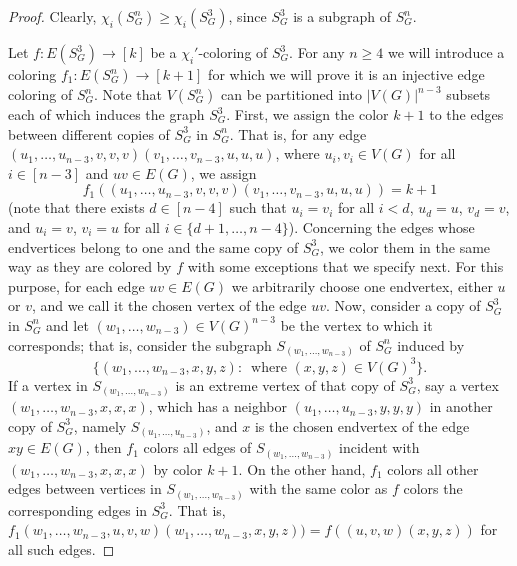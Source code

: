 \documentclass{article}
\begin{document}
\begin{proof}
Clearly, $\chi_i(S_G^n)\geq \chi_i(S_G^3)$, since $S_G^3$ is a subgraph of $S_G^n$.

Let $f:E(S_G^3)\rightarrow [k]$ be a $\chi_i'$-coloring of $S_G^3$. For any $n\ge 4$ we will introduce a coloring $f_1:E(S_G^n)\rightarrow [k+1]$ for which we will prove it is an injective edge coloring of $S_G^n$. Note that $V(S_G^n)$ can be partitioned into $|V(G)|^{n-3}$ subsets each of which induces the graph $S_G^3$.  First, we assign the color $k+1$ to the edges between different copies of $S_G^3$ in $S_G^n$. That is, for any edge $(u_1,\ldots,u_{n-3},v,v,v)(v_1,\ldots,v_{n-3},u,u,u)$, where $u_i,v_i\in V(G)$ for all $i\in [n-3]$ and $uv\in E(G)$, we assign $$f_1((u_1,\ldots,u_{n-3},v,v,v)(v_1,\ldots,v_{n-3},u,u,u))=k+1$$ 
(note that there exists $d\in [n-4]$ such that $u_i=v_i$ for all $i<d$, $u_d=u$, $v_d=v$, and $u_i=v$, $v_i=u$ for all $i\in\{d+1,\ldots,n-4\}$).
Concerning the edges whose endvertices belong to one and the same copy of $S_G^3$, we color them in the same way as they are colored by $f$ with some exceptions that we specify next. For this purpose, for each edge $uv\in E(G)$ we arbitrarily choose one endvertex, either $u$ or $v$, and we call it the chosen vertex of the edge $uv$. Now, consider a copy of $S_G^3$ in $S_G^n$ and let $(w_1,\ldots,w_{n-3})\in V(G)^{n-3}$ be the vertex to which it corresponds; that is, consider the subgraph $S_{(w_1,\ldots,w_{n-3})}$ of $S_G^n$ induced by $$\{(w_1,\ldots,w_{n-3},x,y,z):\, \textrm{ where }(x,y,z)\in V(G)^3\}.$$
If a vertex in $S_{(w_1,\ldots,w_{n-3})}$ is an extreme vertex of that copy of $S_G^3$, say a vertex $(w_1,\ldots,w_{n-3},x,x,x)$, which has a neighbor $(u_1,\ldots,u_{n-3},y,y,y)$ in another copy of $S_G^3$, namely $S_{(u_1,\ldots,u_{n-3})}$, and $x$ is the chosen endvertex of the edge $xy\in E(G)$, then $f_1$ colors all edges of $S_{(w_1,\ldots,w_{n-3})}$ incident with $(w_1,\ldots,w_{n-3},x,x,x)$ by color $k+1$. On the other hand, $f_1$ colors all other edges between vertices in $S_{(w_1,\ldots,w_{n-3})}$ with the same color as $f$ colors the corresponding edges in $S_G^3$. That is, $f_1(w_1,\ldots,w_{n-3},u,v,w)(w_1,\ldots,w_{n-3},x,y,z))=f((u,v,w)(x,y,z))$ for all such edges. 


\end{proof}
\end{document}
